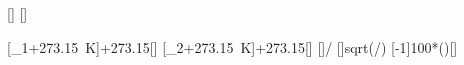 [\degreeCelsius]
[\degreeCelsius]

[\vartheta_1+\SI{273.15}{\kelvin}]{\thEiX+273.15}[\kelvin]
[\vartheta_2+\SI{273.15}{\kelvin}]{\thZwX+273.15}[\kelvin]
[]{\TZwX/\TEiX}
[]{sqrt(\TZwX/\TEiX)}
[-1]{100*()}[\percent]
